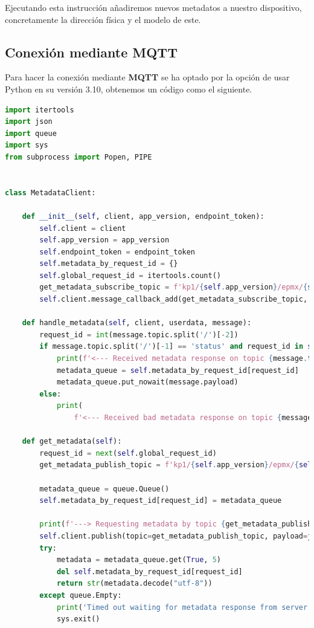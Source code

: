 Ejecutando esta instrucción añadiremos nuevos metadatos a nuestro dispositivo, concretamente la dirección física y el modelo de este.

\subsection{Conexión mediante MQTT} \label{mqtt-connection}

Para hacer la conexión mediante \textbf{MQTT} se ha optado por la opción de usar Python en su versión 3.10, obtenemos un código como el siguiente.

\begin{lstlisting}[language=Python]
import itertools
import json
import queue
import sys
from subprocess import Popen, PIPE


class MetadataClient:

    def __init__(self, client, app_version, endpoint_token):
        self.client = client
        self.app_version = app_version
        self.endpoint_token = endpoint_token
        self.metadata_by_request_id = {}
        self.global_request_id = itertools.count()
        get_metadata_subscribe_topic = f'kp1/{self.app_version}/epmx/{self.endpoint_token}/get/#'
        self.client.message_callback_add(get_metadata_subscribe_topic, self.handle_metadata)

    def handle_metadata(self, client, userdata, message):
        request_id = int(message.topic.split('/')[-2])
        if message.topic.split('/')[-1] == 'status' and request_id in self.metadata_by_request_id:
            print(f'<--- Received metadata response on topic {message.topic}')
            metadata_queue = self.metadata_by_request_id[request_id]
            metadata_queue.put_nowait(message.payload)
        else:
            print(
                f'<--- Received bad metadata response on topic {message.topic}:\n{str(message.payload.decode("utf-8"))}')

    def get_metadata(self):
        request_id = next(self.global_request_id)
        get_metadata_publish_topic = f'kp1/{self.app_version}/epmx/{self.endpoint_token}/get/{request_id}'

        metadata_queue = queue.Queue()
        self.metadata_by_request_id[request_id] = metadata_queue

        print(f'---> Requesting metadata by topic {get_metadata_publish_topic}')
        self.client.publish(topic=get_metadata_publish_topic, payload=json.dumps({}))
        try:
            metadata = metadata_queue.get(True, 5)
            del self.metadata_by_request_id[request_id]
            return str(metadata.decode("utf-8"))
        except queue.Empty:
            print('Timed out waiting for metadata response from server')
            sys.exit()


\end{lstlisting}
